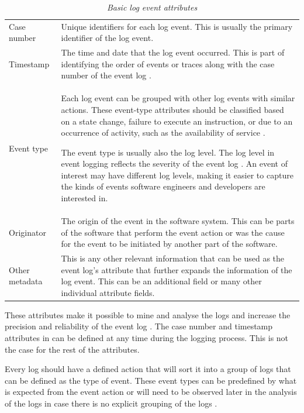 \begin{table}[!htb]
	\centering
	\caption[Basic log event attributes]
	{\textit{Basic log event attributes \cite{Bekeneva2020}}}
	\label{tbl:ch1_logBasicAttributes}
	\begin{tabularx}{\textwidth}{lX}
		\toprule 
		\thead{Attribute} & \thead{Description} \\
		\midrule

		\rowcolor{lightgray}
		Case number & Unique identifiers for each log event. This is usually the primary identifier of the log event. \\

		Timestamp & The time and date that the log event occurred. This is part of identifying the order of events or traces along with the case number of the event log \cite{Kherbouche2017}. \\

		\rowcolor{lightgray}
		Event type & Each log event can be grouped with other log events with similar actions. These event-type attributes should be classified based on a state change, failure to execute an instruction, or due to an occurrence of activity, such as the availability of service \cite{Fedaghi2010}. \par The event type is usually also the log level. The log level in event logging reflects the severity of the event log \cite{Rong2020}. An event of interest may have different log levels, making it easier to capture the kinds of events software engineers and developers are interested in. \\

		Originator & The origin of the event in the software system. This can be parts of the software that perform the event action or was the cause for the event to be initiated by another part of the software. \\

		\rowcolor{lightgray}
		Other metadata & This is any other relevant information that can be used as the event log's attribute that further expands the information of the log event. This can be an additional field or many other individual attribute fields.\\
		\bottomrule
	\end{tabularx}
\end{table}

These attributes make it possible to mine and analyse the logs and increase the precision and reliability of the event log \cite{Kherbouche2017}. The case number and timestamp attributes in  can be defined at any time during the logging process. This is not the case for the rest of the attributes. \par Every log should have a defined action that will sort it into a group of logs that can be defined as the type of event. These event types can be predefined by what is expected from the event action or will need to be observed later in the analysis of the logs in case there is no explicit grouping of the logs \cite{Bekeneva2020, Fedaghi2010}.

